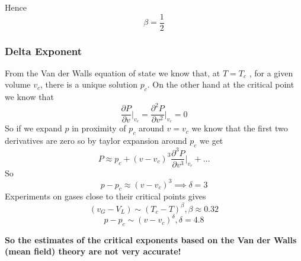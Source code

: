 \documentclass[../../Main/Main.tex]{subfiles}
\begin{document}
Hence
$$
\boxed{ \beta=\frac{1}{2} }
$$




\subsubsection*{Delta Exponent}

From the Van der Walls equation of state we know that, at $T = T_c$ , for a given volume $v_{c}$, there is a unique solution $p_{c}$. On the other hand at the critical point we know that
$$\frac{ \partial P }{ \partial v  }\bigg\rvert_{v_{c}} = \frac{ \partial ^2 P }{ \partial v ^{2} }\bigg\rvert_{v_{c}} = 0 $$
So if we expand $p$ in proximity of $p_{c}$ around $v = v_{c}$ we know that the first two derivatives are zero so by taylor expansion around $p_{c}$ we get
$$P \approx p_{c} + (v- v_{c})^{3}\frac{ \partial^{3} P }{ \partial v^{3}  }\bigg\rvert_{v_{c}} + \dots $$
So
$$p - p_{c} \approx (v-v_{c})^{3} \implies \boxed{ \delta = 3 }$$
Experiments on gases close to their critical points gives 
$$(v_{G} - V_{L}) \sim (T_{c} - T)^{\beta}, \beta \approx 0.32$$
$$p - p_{c} \sim (v - v_{c})^{\delta}, \delta = 4.8$$

\textbf{So the estimates of the critical exponents based on the Van der Walls (mean field) theory are not very accurate!}
\end{document}
